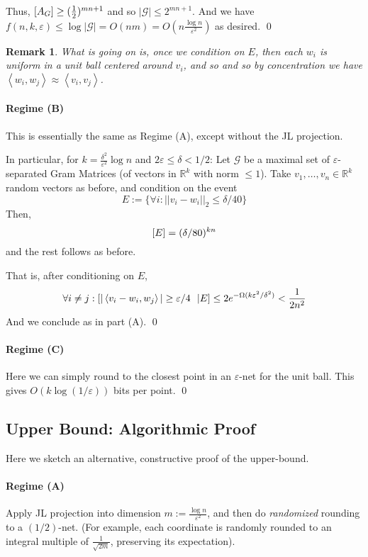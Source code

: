 \documentclass[11pt]{article}
\let\Pr\relax
\DeclareMathOperator*{\Pr}{\mathbb{P}}
\newcommand{\eps}{\varepsilon}
\newcommand{\innp}[1]{\left\langle #1 \right\rangle}
\newcommand{\R}{\mathbb{R}}
\newcommand{\1}{\mathbbm{1}}
\newtheorem{remark}{Remark}
\newcommand{\G}{\mathcal{G}}
\begin{document}
Thus, $\Pr[A_G] \geq (\frac{1}{2})^{mn+1}$ and so $|\G| \leq 2^{mn +1}$.
And we have
$f(n, k, \eps) \leq \log |\G| = O(nm) = O(n \frac{\log n}{\eps^2})$ as desired.
\qed

\begin{remark}
    What is going on is, once we condition on $E$, then
    each $w_i$ is uniform in a unit ball centered around $v_i$,
    and so and so by concentration
    we have $\innp{w_i, w_j} \approx \innp{v_i, v_j}$.
\end{remark}

\paragraph{Regime (B)}
This is essentially the same as Regime (A), except without the JL projection.

In particular, for $k = \frac{\delta^2}{\eps^2}\log n$ and $2\eps \leq \delta < 1/2$:
Let $\G$ be a maximal set of $\eps$-separated Gram Matrices (of vectors in
$\R^k$ with norm $\leq 1$).
Take $v_1, \dots, v_n \in \R^k$ random vectors as before, and condition on the
event
$$E := \{\forall i: ||v_i - w_i||_2 \leq \delta/40 \}$$
Then,
$$\Pr[E] = (\delta/80)^{kn}$$
and the rest follows as before.

That is, after conditioning on $E$,
$$\forall i \neq j: \Pr[|\innp{v_i - w_i, w_j}| \geq \eps/4 ~~|E]
\leq 2 e^{-\Omega(k\eps^2/\delta^2)} < \frac{1}{2n^2}$$
And we conclude as in part (A).
\qed

\paragraph{Regime (C)}
Here we can simply round to the closest point in an $\eps$-net for the unit
ball. This gives $O(k \log(1/\eps))$ bits per point.
\qed

\subsection{Upper Bound: Algorithmic Proof}
Here we sketch an alternative, constructive proof of the upper-bound.

\paragraph{Regime (A)}
Apply JL projection into dimension $m := \frac{\log n}{\eps^2}$,
and then do \emph{randomized} rounding to a $(1/2)$-net.
(For example, each coordinate is randomly rounded to an integral multiple of
$\frac{1}{\sqrt{2m}}$, preserving its expectation).
\end{document}
